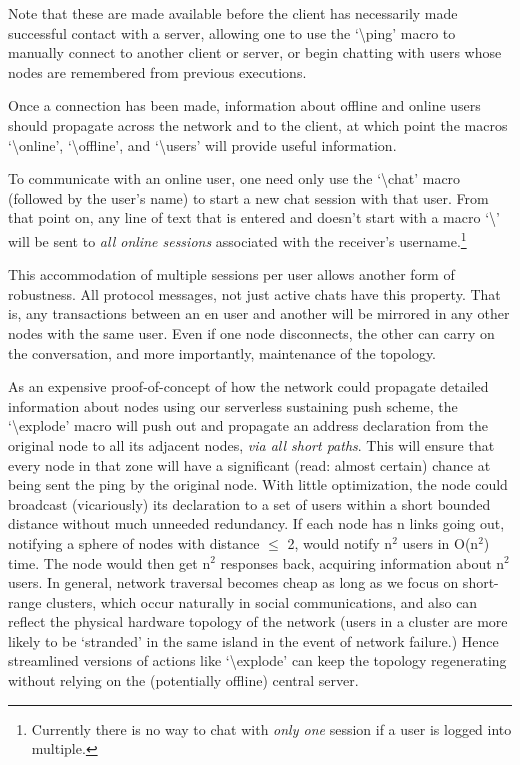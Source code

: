 \documentclass[11pt]{article}
\begin{document}
Note that these are made available before the client has necessarily made successful contact with a server, allowing one to use the `\textbackslash ping' macro to manually connect to another client or server, or begin chatting with users whose nodes are remembered from previous executions.

Once a connection has been made, information about offline and online users should propagate across the network and to the client, at which point the macros `\textbackslash online', `\textbackslash offline', and `\textbackslash users' will provide useful information.

To communicate with an online user, one need only use the `\textbackslash chat' macro (followed by the user's name) to start a new chat session with that user. From that point on, any line of text that is entered and doesn't start with a macro `\textbackslash' will be sent to \emph{all online sessions} associated with the receiver's username.\footnote{Currently there is no way to chat with \emph{only one} session if a user is logged into multiple.}

This accommodation of multiple sessions per user allows another form of robustness. All protocol messages, not just active chats have this property. That is, any transactions between an en user and another will be mirrored in any other nodes with the same user. Even if one node disconnects, the other can carry on the conversation, and more importantly, maintenance of the topology.

As an expensive proof-of-concept of how the network could propagate detailed information about nodes using our serverless sustaining push scheme, the `\textbackslash explode' macro will push out and propagate an address declaration from the original node to all its adjacent nodes, \emph{via all short paths}. This will ensure that every node in that zone will have a significant (read: almost certain) chance at being sent the ping by the original node. With little optimization, the node could broadcast (vicariously) its declaration to a set of users within a short bounded distance without much unneeded redundancy. If each node has n links going out, notifying a sphere of nodes with distance $\leq$ 2, would notify n$^2$ users in O(n$^2$) time. The node would then get n$^2$ responses back, acquiring information about n$^2$ users. In general, network traversal becomes cheap as long as we focus on short-range clusters, which occur naturally in social communications, and also can reflect the physical hardware topology of the network (users in a cluster are more likely to be `stranded' in the same island in the event of network failure.) Hence streamlined versions of actions like `\textbackslash explode' can keep the topology regenerating without relying on the (potentially offline) central server.
\end{document}
